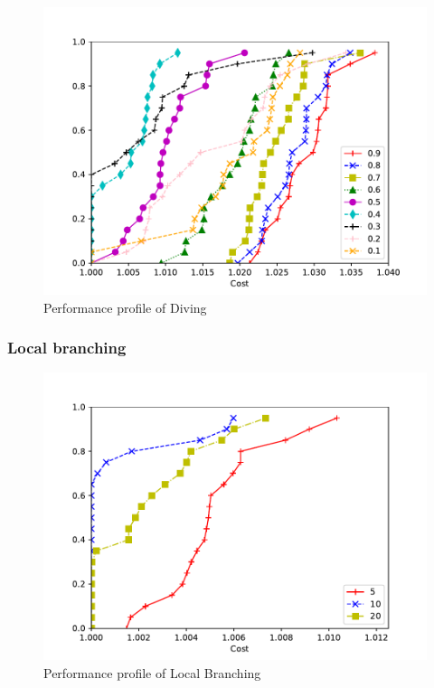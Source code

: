 \documentclass{article}
\begin{document}
\begin{figure}[ht]
        \caption{Performance profile of Diving}
        \label{fig:ht_diving}
        \centering
        \includegraphics[width=340pt]{assets/ht_diving.pdf}
\end{figure}

\clearpage
\subsubsection{Local branching}


\begin{figure}[ht]
        \caption{Performance profile of Local Branching}
        \label{fig:ht_localb}
        \centering
        \includegraphics[width=340pt]{assets/ht_localb.pdf}
\end{figure}
\end{document}
